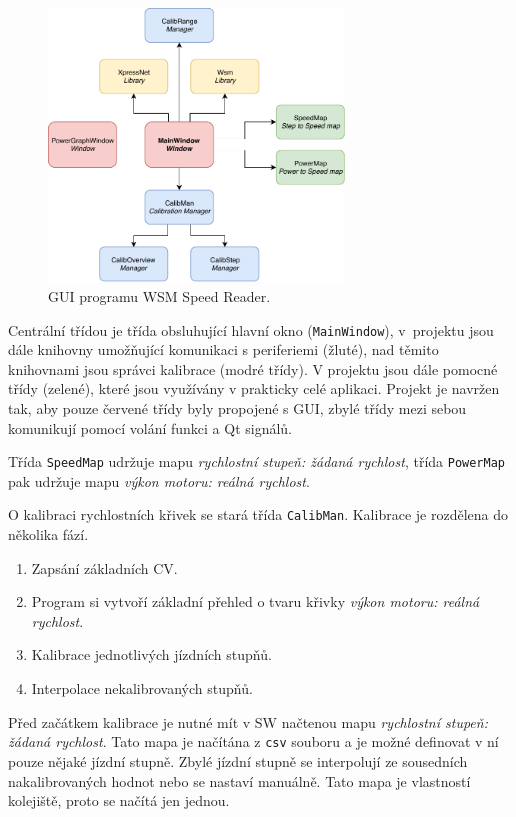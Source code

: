 \begin{figure}[h]
\includegraphics[width=0.7\textwidth]{data/ac_classes.pdf}
\caption{GUI programu WSM Speed Reader.}
\label{fig:ac-classes}
\end{figure}

Centrální třídou je třída obsluhující hlavní okno (\texttt{MainWindow}),
v~projektu jsou dále knihovny umožňující komunikaci s periferiemi (žluté),
nad těmito knihovnami jsou správci kalibrace (modré třídy). V projektu jsou
dále pomocné třídy (zelené), které jsou využívány v prakticky celé aplikaci.
Projekt je navržen tak, aby pouze červené třídy byly propojené s GUI, zbylé
třídy mezi sebou komunikují pomocí volání funkci a Qt signálů.

Třída \texttt{SpeedMap} udržuje mapu \textit{rychlostní stupeň: žádaná rychlost},
třída \texttt{PowerMap} pak udržuje mapu \textit{výkon motoru: reálná rychlost}.

O kalibraci rychlostních křivek se stará třída \texttt{CalibMan}. Kalibrace
je rozdělena do několika fází.

\begin{enumerate}
\item Zapsání základních CV.
\item Program si vytvoří základní přehled o tvaru křivky \textit{výkon motoru:
      reálná rychlost}.
\item Kalibrace jednotlivých jízdních stupňů.
\item Interpolace nekalibrovaných stupňů.
\end{enumerate}

Před začátkem kalibrace je nutné mít v SW načtenou mapu \textit{rychlostní
stupeň: žádaná rychlost}. Tato mapa je načítána z \texttt{csv} souboru a je
možné definovat v ní pouze nějaké jízdní stupně. Zbylé jízdní stupně se
interpolují ze sousedních nakalibrovaných hodnot nebo se nastaví manuálně.
Tato mapa je vlastností kolejiště, proto se načítá jen jednou.


